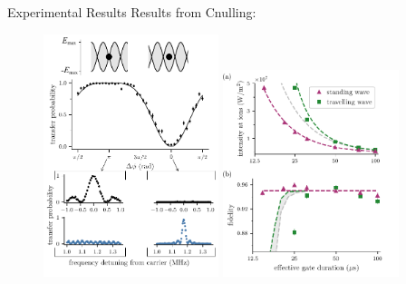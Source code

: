 \documentclass[final]{beamer}
\begin{document}
\begin{frame}{}
\begin{center}
\begin{columns}[t]
\begin{column}{0.49\textwidth}
  \end{column}
  \begin{column}{0.49\textwidth}
    \begin{alertblock}{Experimental Results}
      Results from Cnulling:
      \begin{figure}
        \includegraphics[width=0.48\textwidth]{./figs/Figure_2_v2.pdf}
        \includegraphics[width=0.48\textwidth]{./figs/two_qubit_gate_figure.pdf}
      \end{figure}
    \end{alertblock}



\end{column}
\end{columns}
\end{center}
\end{frame}
\end{document}
